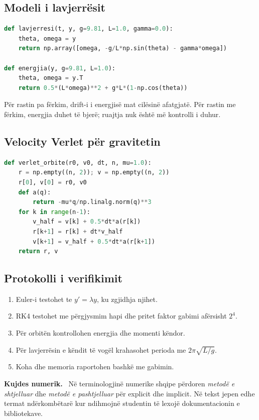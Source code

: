 \documentclass[11pt,oneside,openany]{book}
\newenvironment{kujdes}{\par\medskip\noindent\textbf{Kujdes numerik.}\ }{\par\medskip}
\begin{document}
\subsection{Modeli i lavjerrësit}
\begin{lstlisting}[language=Python]
def lavjerresi(t, y, g=9.81, L=1.0, gamma=0.0):
    theta, omega = y
    return np.array([omega, -g/L*np.sin(theta) - gamma*omega])

def energjia(y, g=9.81, L=1.0):
    theta, omega = y.T
    return 0.5*(L*omega)**2 + g*L*(1-np.cos(theta))
\end{lstlisting}
Për rastin pa fërkim, drift-i i energjisë mat cilësinë afatgjatë. Për rastin me fërkim, energjia duhet të bjerë; ruajtja nuk është më kontrolli i duhur.

\subsection{Velocity Verlet për gravitetin}
\begin{lstlisting}[language=Python,caption={Skema simplektike për orbitën.}]
def verlet_orbite(r0, v0, dt, n, mu=1.0):
    r = np.empty((n, 2)); v = np.empty((n, 2))
    r[0], v[0] = r0, v0
    def a(q):
        return -mu*q/np.linalg.norm(q)**3
    for k in range(n-1):
        v_half = v[k] + 0.5*dt*a(r[k])
        r[k+1] = r[k] + dt*v_half
        v[k+1] = v_half + 0.5*dt*a(r[k+1])
    return r, v
\end{lstlisting}

\subsection{Protokolli i verifikimit}
\begin{enumerate}
\item Euler-i testohet te $y'=\lambda y$, ku zgjidhja njihet.
\item RK4 testohet me përgjysmim hapi dhe pritet faktor gabimi afërsisht $2^4$.
\item Për orbitën kontrollohen energjia dhe momenti këndor.
\item Për lavjerrësin e këndit të vogël krahasohet perioda me $2\pi\sqrt{L/g}$.
\item Koha dhe memoria raportohen bashkë me gabimin.
\end{enumerate}

\begin{kujdes}
Në terminologjinë numerike shqipe përdoren \emph{metodë e shtjelluar} dhe \emph{metodë e pashtjelluar} për explicit dhe implicit. Në tekst jepen edhe termat ndërkombëtarë kur ndihmojnë studentin të lexojë dokumentacionin e bibliotekave.
\end{kujdes}
\end{document}
